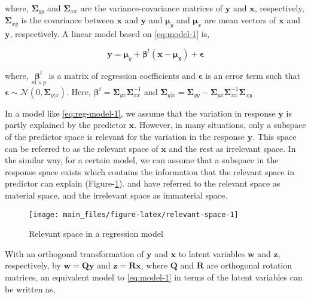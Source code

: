\documentclass[12pt,3p,authoryear]{elsarticle}
\begin{document}
where, \(\boldsymbol{\Sigma}_{yy}\) and \(\boldsymbol{\Sigma}_{xx}\) are
the variance-covariance matrices of \(\mathbf{y}\) and \(\mathbf{x}\),
respectively, \(\boldsymbol{\Sigma}_{xy}\) is the covariance between
\(\mathbf{x}\) and \(\mathbf{y}\) and \(\boldsymbol{\mu}_y\) and
\(\boldsymbol{\mu}_x\) are mean vectors of \(\mathbf{x}\) and
\(\mathbf{y}\), respectively. A linear model based on \eqref{eq:model-1}
is,

\begin{equation}
\mathbf{y} = \boldsymbol{\mu}_y + 
  \boldsymbol{\beta}^t(\mathbf{x} - \boldsymbol{\mu_x}) + 
  \boldsymbol{\epsilon}
\label{eq:reg-model-1}
\end{equation}

where, \(\underset{m\times p}{\boldsymbol{\beta}^t}\) is a matrix of
regression coefficients and \(\boldsymbol{\epsilon}\) is an error term
such that
\(\boldsymbol{\epsilon} \sim \mathcal{N}(0, \boldsymbol{\Sigma}_{y|x})\).
Here,
\(\boldsymbol{\beta}^t = \mathbold{\Sigma}_{yx}\mathbold{\Sigma}_{xx}^{-1}\)
and
\(\boldsymbol{\Sigma}_{y|x} = \boldsymbol{\Sigma}_{yy} - \boldsymbol{\Sigma}_{yx}\boldsymbol{\Sigma}_{xx}^{-1}\boldsymbol{\Sigma}_{xy}\)

In a model like \eqref{eq:reg-model-1}, we assume that the variation in
response \(\mathbf{y}\) is partly explained by the predictor
\(\mathbf{x}\). However, in many situations, only a subspace of the
predictor space is relevant for the variation in the response
\(\mathbf{y}\). This space can be referred to as the relevant space of
\(\mathbf{x}\) and the rest as irrelevant space. In the similar way, for
a certain model, we can assume that a subspace in the response space
exists which contains the information that the relevant space in
predictor can explain (Figure-\ref{fig:relevant-space}).
\citet{cook2010envelope} and \citet{cook2015simultaneous} have referred
to the relevant space as material space, and the irrelevant space as
immaterial space.

\begin{figure}

{\centering \texttt{[image: main\_files/figure-latex/relevant-space-1]} 

}

\caption{Relevant space in a regression model}\label{fig:relevant-space}
\end{figure}

With an orthogonal transformation of \(\mathbf{y}\) and \(\mathbf{x}\)
to latent variables \(\mathbf{w}\) and \(\mathbf{z}\), respectively, by
\(\mathbf{w=Qy}\) and \(\mathbf{z = Rx}\), where \(\mathbf{Q}\) and
\(\mathbf{R}\) are orthogonal rotation matrices, an equivalent model to
\eqref{eq:model-1} in terms of the latent variables can be written as,
\end{document}
